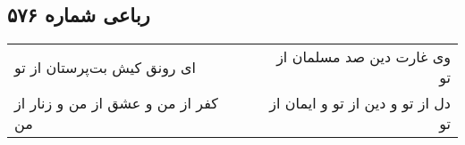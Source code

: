 \begin{center}
\section*{رباعی شماره ۵۷۶}
\label{sec:sh576}
\begin{longtable}{l p{0.5cm} r}
ای رونق کیش بت‌پرستان از تو
&&
وی غارت دین صد مسلمان از تو
\\
کفر از من و عشق از من و زنار از من
&&
دل از تو و دین از تو و ایمان از تو
\\
\end{longtable}
\end{center}

